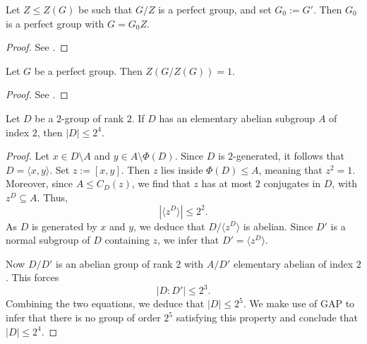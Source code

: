 \documentclass[bysection, amsart]{standard}
\begin{document}
\begin{lemma} \label{lm:perfect-cen}
    Let $Z \leq Z(G)$ be such that $G/Z$ is a perfect group, and set $G_0 := G'$. Then $G_0$ is a perfect group with $G = G_0Z$.
\end{lemma}
\begin{proof}
    See \cite[1.5.3]{ks06}.
\end{proof}

\begin{lemma}[Gr{\"u}n's Lemma] \label{lm:grun}
    Let $G$ be a perfect group. Then $Z(G/Z(G)) = 1$.
\end{lemma}
\begin{proof}
    See \cite[Satz 4]{paper:grun}.
\end{proof}

\begin{lemma} \label{lm:rank2-max-rank3}
    Let $D$ be a $2$-group of rank $2$. If $D$ has an elementary abelian subgroup $A$ of index $2$, then $|D| \leq 2^4$.
\end{lemma}
\begin{proof}
    Let $x \in D \setminus A$ and $y \in A \setminus \Phi(D)$. Since $D$ is $2$-generated, it follows that $D = \langle x, y\rangle$. Set $z := [x, y]$. Then $z$ lies inside $\Phi(D) \leq A$, meaning that $z^2 = 1$. Moreover, since $A \leq C_D(z)$, we find that $z$ has at most $2$ conjugates in $D$, with $z^D \subseteq A$. Thus,     \[|\langle z^D \rangle| \leq 2^2.\]
    As $D$ is generated by $x$ and $y$, we deduce that $D/\langle z^D \rangle$ is abelian. Since $D'$ is a normal subgroup of $D$ containing $z$, we infer that $D' = \langle z^D \rangle$. 
    
    Now $D/D'$ is an abelian group of rank $2$ with $A/D'$ elementary abelian of index $2$. This forces 
    \[|D : D'| \leq 2^3.\]
    Combining the two equations, we deduce that $|D| \leq 2^5$. We make use of GAP \cite{GAP4} to infer that there is no group of order $2^5$ satisfying this property and conclude that $|D| \leq 2^4$.
\end{proof}
\end{document}
